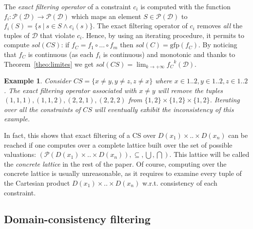 \documentclass[submission,copyright,creativecommons]{eptcs}
\newtheorem{example}{Example}
\newcommand{\parties}[1]{\mathcal{P}(#1)}
\newcommand{\gfp}{\ensuremath{\textrm{gfp}}}
\begin{document}
\noindent
The {\it exact filtering operator} of a constraint $c_i$ is computed with the function
$f_i : \parties{\mathcal{D}} \rightarrow \parties{\mathcal{D}}$ which maps an element $S \in \parties{\mathcal{D}}$ to 
$f_i(S) = \{s~|~ s\in S \land c_i(s)\}$.
The exact filtering operator of $c_i$ removes {\it all} the tuples of $\mathcal{D}$ that violate $c_i$.
Hence, by using an iterating procedure, it permits to compute $sol(CS)$:
if $f_C = f_1 \circ \ldots \circ f_m$ then $sol(C) = \gfp(f_C)$.
By noticing that $f_C$ is continuous (as each $f_i$ is continuous) and monotonic and thanks to Theorem~\ref{theo:limites} 
we get $sol(CS) = \lim_{k \rightarrow +\infty} {f_C}^k(\mathcal{D})$. 
\begin{example}
Consider $CS=\{x \neq y, y \neq z, z \neq x\}$ where $x \in 1..2, y \in 1..2, z \in 1..2$. The exact
filtering operator associated with $x \neq y$ will remove the tuples $(1,1,1),(1,1,2),(2,2,1),(2,2,2)$ from 
$\{1,2\} \times \{1,2\} \times \{1,2\}$. Iterating over all the constraints of $CS$ will eventually exhibit the inconsistency of this example.
\end{example}
\noindent
In fact, this shows that exact filtering of a CS over $D(x_1) \times .. \times D(x_n)$ 
can be reached if one computes over a complete lattice built over the set of possible valuations: 
$(\mathcal{P}(D(x_1) \times .. \times D(x_n)), \subseteq, \bigcup,\bigcap)$. 
This lattice will be called the {\it concrete lattice} in the rest of the paper.
Of course, computing over the concrete lattice is usually unreasonable, as it requires to examine every tuple of the Cartesian product 
$D(x_1) \times .. \times D(x_n)$ w.r.t. consistency of each constraint.
 
\subsection{Domain-consistency filtering}
\end{document}
